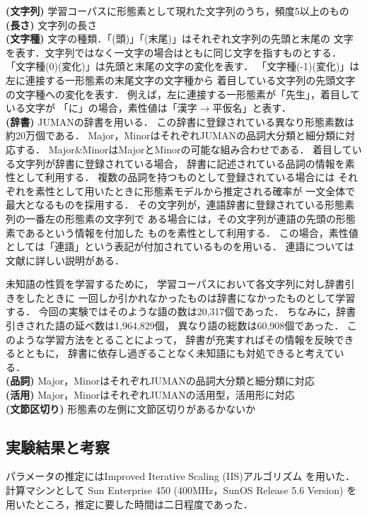 \noindent
{\bf (文字列)} 学習コーパスに形態素として現れた文字列のうち，頻度5以上のもの\\
{\bf (長さ)} 文字列の長さ\\
{\bf (文字種)} 文字の種類．「(頭)」「(末尾)」はそれぞれ文字列の先頭と末尾の
文字を表す．文字列ではなく一文字の場合はともに同じ文字を指すものとする．
「文字種(0)(変化)」は先頭と末尾の文字の変化を表す．
「文字種(-1)(変化)」は左に連接する一形態素の末尾文字の文字種から
着目している文字列の先頭文字の文字種への変化を表す．
例えば，左に連接する一形態素が「先生」，着目している文字が
「に」の場合，素性値は「漢字$\rightarrow$平仮名」と表す．\\
{\bf (辞書)} JUMANの辞書を用いる．
この辞書に登録されている異なり形態素数は約20万個である．
Major，MinorはそれぞれJUMANの品詞大分類と細分類に対応する．
Major\&MinorはMajorとMinorの可能な組み合わせである．
着目している文字列が辞書に登録されている場合，
辞書に記述されている品詞の情報を素性として利用する．
複数の品詞を持つものとして登録されている場合には
それぞれを素性として用いたときに形態素モデルから推定される確率が
一文全体で最大となるものを採用する．
その文字列が，連語辞書に登録されている形態素列の一番左の形態素の文字列で
ある場合には，その文字列が連語の先頭の形態素であるという情報を付加した
ものを素性として利用する．
この場合，素性値としては「連語」という表記が付加されているものを用いる．
連語については文献\cite{Yamaji:96}に詳しい説明がある．

未知語の性質を学習するために，
学習コーパスにおいて各文字列に対し辞書引きをしたときに
一回しか引かれなかったものは辞書になかったものとして学習する．
今回の実験ではそのような語の数は20,317個であった．
ちなみに，辞書引きされた語の延べ数は1,964,829個，
異なり語の総数は60,908個であった．
このような学習方法をとることによって，
辞書が充実すればその情報を反映できるとともに，
辞書に依存し過ぎることなく未知語にも対処できると考えている．\\
{\bf (品詞)} Major，MinorはそれぞれJUMANの品詞大分類と細分類に対応\\
{\bf (活用)} Major，MinorはそれぞれJUMANの活用型，活用形に対応\\
{\bf (文節区切り)} 形態素の左側に文節区切りがあるかないか

\subsection{実験結果と考察}
\label{sec:exp_result}

パラメータの推定にはImproved Iterative Scaling (IIS)アルゴリズム
\cite{pietra95}
を用いた．
計算マシンとして Sun Enterprise 450 (400MHz，SunOS Release 5.6 Version) 
を用いたところ，推定に要した時間は二日程度であった．

